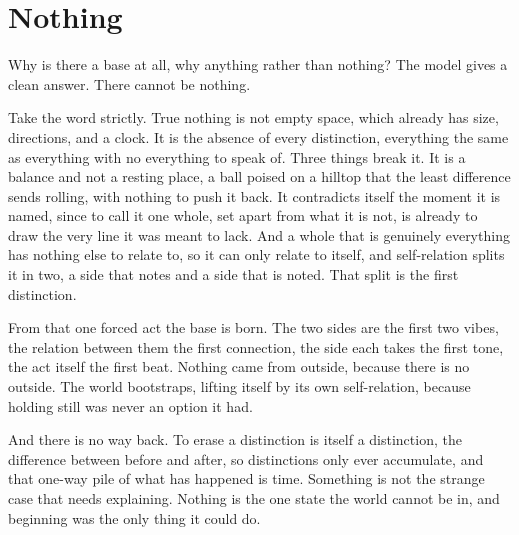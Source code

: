 \section{Nothing}

Why is there a base at all, why anything rather than nothing? The model gives a clean answer. There cannot be nothing.

Take the word strictly. True nothing is not empty space, which already has size, directions, and a clock. It is the absence of every distinction, everything the same as everything with no everything to speak of. Three things break it. It is a balance and not a resting place, a ball poised on a hilltop that the least difference sends rolling, with nothing to push it back. It contradicts itself the moment it is named, since to call it one whole, set apart from what it is not, is already to draw the very line it was meant to lack. And a whole that is genuinely everything has nothing else to relate to, so it can only relate to itself, and self-relation splits it in two, a side that notes and a side that is noted. That split is the first distinction.

From that one forced act the base is born. The two sides are the first two vibes, the relation between them the first connection, the side each takes the first tone, the act itself the first beat. Nothing came from outside, because there is no outside. The world bootstraps, lifting itself by its own self-relation, because holding still was never an option it had.

And there is no way back. To erase a distinction is itself a distinction, the difference between before and after, so distinctions only ever accumulate, and that one-way pile of what has happened is time. Something is not the strange case that needs explaining. Nothing is the one state the world cannot be in, and beginning was the only thing it could do.
